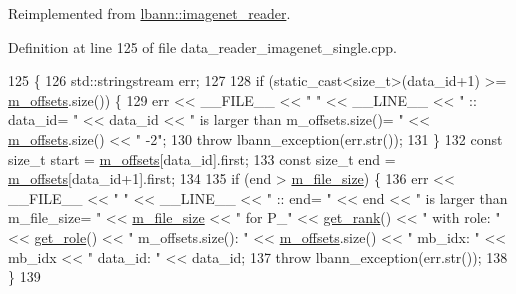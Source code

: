 Reimplemented from \hyperlink{classlbann_1_1imagenet__reader_a6659e90c0243da40f214a877f65eb8ac}{lbann\+::imagenet\+\_\+reader}.



Definition at line 125 of file data\+\_\+reader\+\_\+imagenet\+\_\+single.\+cpp.


\begin{DoxyCode}
125                                                                                  \{
126   std::stringstream err;
127 
128   \textcolor{keywordflow}{if} (static\_cast<size\_t>(data\_id+1) >= \hyperlink{classlbann_1_1imagenet__reader__single_a605ba53f4e3fa02a4fced38d41465a10}{m\_offsets}.size()) \{
129     err << \_\_FILE\_\_ << \textcolor{stringliteral}{" "} << \_\_LINE\_\_ << \textcolor{stringliteral}{" :: data\_id= "} << data\_id << \textcolor{stringliteral}{" is larger than m\_offsets.size()= 
      "} << \hyperlink{classlbann_1_1imagenet__reader__single_a605ba53f4e3fa02a4fced38d41465a10}{m\_offsets}.size() << \textcolor{stringliteral}{" -2"};
130     \textcolor{keywordflow}{throw} lbann\_exception(err.str());
131   \}
132   \textcolor{keyword}{const} \textcolor{keywordtype}{size\_t} start = \hyperlink{classlbann_1_1imagenet__reader__single_a605ba53f4e3fa02a4fced38d41465a10}{m\_offsets}[data\_id].first;
133   \textcolor{keyword}{const} \textcolor{keywordtype}{size\_t} end = \hyperlink{classlbann_1_1imagenet__reader__single_a605ba53f4e3fa02a4fced38d41465a10}{m\_offsets}[data\_id+1].first;
134 
135   \textcolor{keywordflow}{if} (end > \hyperlink{classlbann_1_1imagenet__reader__single_aa1a20a782f97e697d9d70371a5e33384}{m\_file\_size}) \{
136     err << \_\_FILE\_\_ << \textcolor{stringliteral}{" "} << \_\_LINE\_\_ << \textcolor{stringliteral}{" :: end= "} << end << \textcolor{stringliteral}{" is larger than m\_file\_size= "} << 
      \hyperlink{classlbann_1_1imagenet__reader__single_aa1a20a782f97e697d9d70371a5e33384}{m\_file\_size} << \textcolor{stringliteral}{" for P\_"} << \hyperlink{classlbann_1_1generic__data__reader_ab5321bd7c6e83845785753366e6d9e64}{get\_rank}() << \textcolor{stringliteral}{" with role: "} << 
      \hyperlink{classlbann_1_1generic__data__reader_a92982e1b399f37e2ead5aa440883cba5}{get\_role}() << \textcolor{stringliteral}{" m\_offsets.size(): "} << \hyperlink{classlbann_1_1imagenet__reader__single_a605ba53f4e3fa02a4fced38d41465a10}{m\_offsets}.size() << \textcolor{stringliteral}{" mb\_idx: "} << mb\_idx << \textcolor{stringliteral}{"
       data\_id: "} << data\_id;
137     \textcolor{keywordflow}{throw} lbann\_exception(err.str());
138   \}
139 

\end{DoxyCode}
